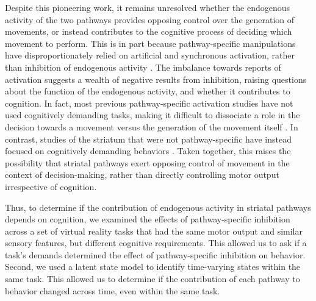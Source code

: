 Despite this pioneering work, it remains unresolved whether the endogenous activity of the two pathways provides opposing control over the generation of movements, or instead contributes to the cognitive process of deciding which movement to perform. This is in part because pathway-specific manipulations have disproportionately relied on artificial and synchronous activation, rather than inhibition of endogenous activity \cite{kravitz_regulation_2010, roseberry_cell-type-specific_2016, bartholomew_striatonigral_2016, bakhurin_opponent_2020, lobo_cell_2010, kravitz_distinct_2012,yttri_opponent_2016,tai_transient_2012,nonomura_monitoring_2018,lee_anatomically_2020,tang_opposing_2021}. The imbalance towards reports of activation suggests a wealth of negative results from inhibition, raising questions about the function of the endogenous activity, and whether it contributes to cognition. In fact, most previous pathway-specific activation studies have not used cognitively demanding tasks, making it difficult to dissociate a role in the decision towards a movement versus the generation of the movement itself \cite{kravitz_regulation_2010, roseberry_cell-type-specific_2016, bartholomew_striatonigral_2016, lobo_cell_2010, lee_anatomically_2020,parker_diametric_2018,lee_activation_2016}. In contrast, studies of the striatum that were not pathway-specific have instead focused on cognitively demanding behaviors \cite{london_coordinated_2018,balleine_role_2007,yartsev_causal_2018,lau_value_2008,ding_separate_2012,barnes_activity_2005,yin_dynamic_2009,akhlaghpour_dissociated_2016}. Taken together, this raises the possibility that striatal pathways exert opposing control of movement in the context of decision-making, rather than directly controlling motor output irrespective of cognition.

Thus, to determine if the contribution of endogenous activity in striatal pathways depends on cognition, we examined the effects of pathway-specific inhibition across a set of virtual reality tasks that had the same motor output and similar sensory features, but different cognitive requirements. This allowed us to ask if a task’s demands determined the effect of pathway-specific inhibition on behavior. Second, we used a latent state model to identify time-varying states within the same task. This allowed us to determine if the contribution of each pathway to behavior changed across time, even within the same task.

